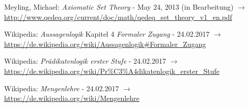 \documentclass[english,ngerman,parskip=half,headsepline,footsepline]{scrreprt}
\begin{document}
\begin{flushleft}
\begin{thebibliography}{12}
			Meyling, Michael: \emph{Axiomatic Set Theory} - May 24, 2013 (in Bearbeitung) $\rightarrow$ \url{http://www.qedeq.org/current/doc/math/qedeq_set_theory_v1_en.pdf}
			
			Wikipedia: \emph{Aussagenlogik} Kapitel 4 \emph{Formaler Zugang} - 24.02.2017 $\rightarrow$ \url{https://de.wikipedia.org/wiki/Aussagenlogik#Formaler_Zugang}
			
			Wikipedia: \emph{Prädikatenlogik erster Stufe} - 24.02.2017  $\rightarrow$ \url{https://de.wikipedia.org/wiki/Pr%C3%A4dikatenlogik_erster_Stufe}
			
			Wikipedia: \emph{Mengenlehre} - 24.02.2017  $\rightarrow$ \url{https://de.wikipedia.org/wiki/Mengenlehre}
				
		\end{thebibliography}
	\end{flushleft}
	\thispagestyle{scrheadings}
	
\end{document}
